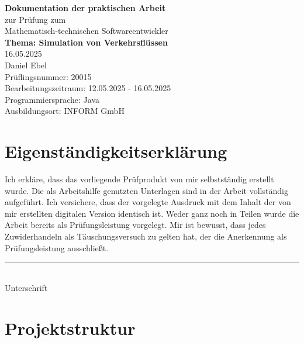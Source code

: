 \documentclass[a4paper,12pt]{report}
\begin{document}
\begin{titlepage}
    \centering
    \vspace*{3cm}
    {\Huge \textbf{Dokumentation der praktischen Arbeit}}\\[2cm]
    {\large zur Prüfung zum \\ Mathematisch-technischen Softwareentwickler}\\[2cm]
    {\Large \textbf{Thema: Simulation von Verkehrsflüssen}}\\[1cm]
    {16.05.2025}\\[5cm]
    {Daniel Ebel}\\[2cm]
    Prüflingsnummer: 20015\\[0.5cm]
    Bearbeitungszeitraum: 12.05.2025 - 16.05.2025\\[0.5cm]
    Programmiersprache: Java\\[0.5cm]
    Ausbildungsort: INFORM GmbH
\end{titlepage}

\chapter*{Eigenständigkeitserklärung}
Ich erkläre, dass das vorliegende Prüfprodukt von mir selbstständig erstellt wurde.
Die als Arbeitshilfe genutzten Unterlagen sind in der Arbeit vollständig aufgeführt.
Ich versichere, dass der vorgelegte Ausdruck mit dem Inhalt der von mir erstellten digitalen Version identisch ist.
Weder ganz noch in Teilen wurde die Arbeit bereits als Prüfungsleistung vorgelegt.
Mir ist bewusst, dass jedes Zuwiderhandeln als Täuschungsversuch zu gelten hat, der die Anerkennung als Prüfungsleistung ausschließt.

\vspace{2cm}

\noindent\rule{7cm}{0.4pt}\\
Unterschrift

\tableofcontents














\chapter{Projektstruktur}
\end{document}
